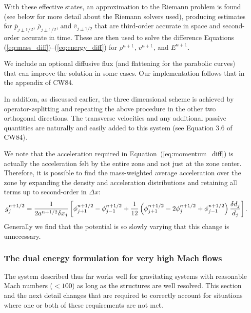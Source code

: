 With these effective states, an approximation to the Riemann problem is found
(see below for more detail about the Riemann solvers used), producing estimates for 
$\overline{p}_{j\pm 1/2}$, $\overline{\rho}_{j\pm1/2}$, and $\overline{v}_{j\pm 1/2}$ that are third-order
accurate in space and second-order accurate in time.  These are then
used to solve the difference Equations (\ref{eq:mass_diff})--(\ref{eq:energy_diff}) for $\rho^{n+1}$, $v^{n+1}$, and $E^{n+1}$.

We include an optional diffusive flux (and flattening for the parabolic curves) that can improve the solution in some cases.  Our implementation follows that in the appendix of CW84.

In addition, as discussed earlier, the three dimensional scheme is achieved by operator-zsplitting and repeating the above procedure in the other two orthogonal directions.  The transverse velocities and any additional passive quantities are naturally and easily added to this system (see Equation 3.6 of CW84).  

We note that the acceleration required in Equation~(\ref{eq:momentum_diff}) is actually the
acceleration felt by the entire zone and not just at the zone center.
Therefore, it is possible to find the mass-weighted average acceleration over the zone
by expanding the density and acceleration distributions and
retaining all terms up to second-order in $\Delta x$:
%
\begin{equation}
g_j^{n+1/2} = 
       \frac{1}{2 a^{n+1/2} \delta x_j} \left[ 
             \phi_{j+1}^{n+1/2} 
           - \phi_{j-1}^{n+1/2} 
           + \frac{1}{12} \left(    \phi^{n+1/2}_{j+1} 
                                 - 2\phi^{n+1/2}_j 
                                 + \phi^{n+1/2}_{j-1} \right) 
                                   {\delta d_j \over d_j}
       \right].
       \label{eq:accel}
\end{equation}
Generally we find that the potential is so slowly varying that this change is unnecessary.


\subsubsection{The dual energy formulation for  very high Mach flows} %

The system described thus far works well for gravitating systems with
reasonable Mach numbers ($<100$) as long as the structures are well resolved.
This section and the next detail changes that are required
to correctly account for situations where one or both of these
requirements are not met.

